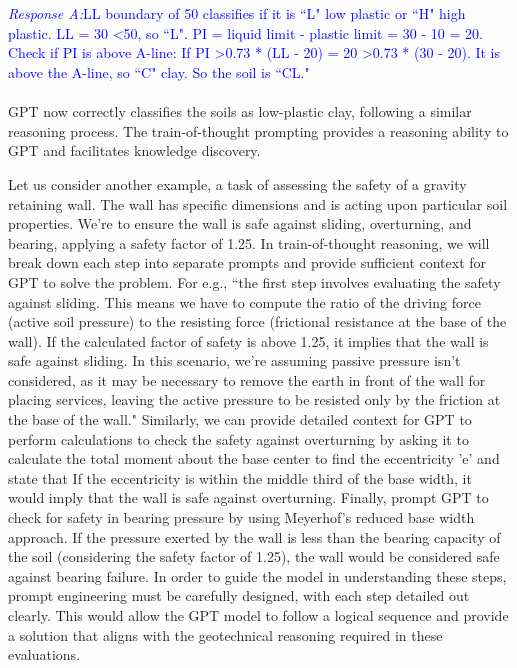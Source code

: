\documentclass{article}
\begin{document}
\\\\
\textcolor{blue}{\textit{Response A:}LL boundary of 50 classifies if it is ``L" low plastic or ``H" high plastic. LL = 30 \textless 50, so ``L". PI = liquid limit - plastic limit = 30 - 10 = 20. Check if PI is above A-line: If PI \textgreater 0.73 * (LL - 20) = 20 \textgreater 0.73 * (30 - 20). It is above the A-line, so ``C" clay. So the soil is ``CL."}
\\\\GPT now correctly classifies the soils as low-plastic clay, following a similar reasoning process. The train-of-thought prompting provides a reasoning ability to GPT and facilitates knowledge discovery. 

Let us consider another example, a task of assessing the safety of a gravity retaining wall. The wall has specific dimensions and is acting upon particular soil properties. We're to ensure the wall is safe against sliding, overturning, and bearing, applying a safety factor of 1.25. In train-of-thought reasoning, we will break down each step into separate prompts and provide sufficient context for GPT to solve the problem. For e.g., ``the first step involves evaluating the safety against sliding. This means we have to compute the ratio of the driving force (active soil pressure) to the resisting force (frictional resistance at the base of the wall). If the calculated factor of safety is above 1.25, it implies that the wall is safe against sliding. In this scenario, we're assuming passive pressure isn't considered, as it may be necessary to remove the earth in front of the wall for placing services, leaving the active pressure to be resisted only by the friction at the base of the wall." Similarly, we can provide detailed context for GPT to perform calculations to check the safety against overturning by asking it to calculate the total moment about the base center to find the eccentricity 'e' and state that If the eccentricity is within the middle third of the base width, it would imply that the wall is safe against overturning. Finally, prompt GPT to check for safety in bearing pressure by using Meyerhof's reduced base width approach. If the pressure exerted by the wall is less than the bearing capacity of the soil (considering the safety factor of 1.25), the wall would be considered safe against bearing failure. In order to guide the model in understanding these steps, prompt engineering must be carefully designed, with each step detailed out clearly. This would allow the GPT model to follow a logical sequence and provide a solution that aligns with the geotechnical reasoning required in these evaluations.
\end{document}
